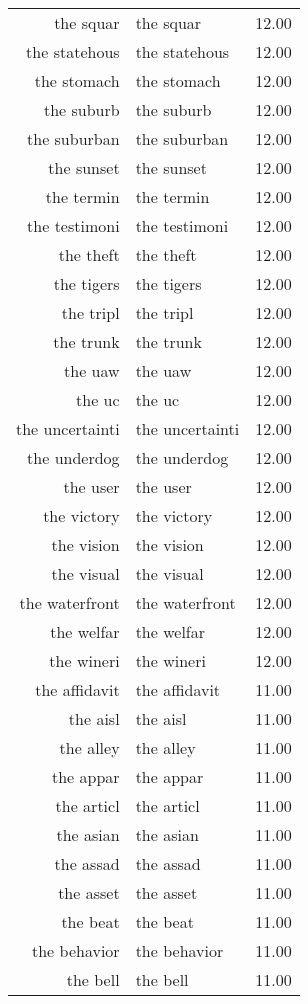 \begin{table}[ht]
\begin{tabular}{rlr}
  the squar & the squar & 12.00 \\ 
  the statehous & the statehous & 12.00 \\ 
  the stomach & the stomach & 12.00 \\ 
  the suburb & the suburb & 12.00 \\ 
  the suburban & the suburban & 12.00 \\ 
  the sunset & the sunset & 12.00 \\ 
  the termin & the termin & 12.00 \\ 
  the testimoni & the testimoni & 12.00 \\ 
  the theft & the theft & 12.00 \\ 
  the tigers & the tigers & 12.00 \\ 
  the tripl & the tripl & 12.00 \\ 
  the trunk & the trunk & 12.00 \\ 
  the uaw & the uaw & 12.00 \\ 
  the uc & the uc & 12.00 \\ 
  the uncertainti & the uncertainti & 12.00 \\ 
  the underdog & the underdog & 12.00 \\ 
  the user & the user & 12.00 \\ 
  the victory & the victory & 12.00 \\ 
  the vision & the vision & 12.00 \\ 
  the visual & the visual & 12.00 \\ 
  the waterfront & the waterfront & 12.00 \\ 
  the welfar & the welfar & 12.00 \\ 
  the wineri & the wineri & 12.00 \\ 
  the affidavit & the affidavit & 11.00 \\ 
  the aisl & the aisl & 11.00 \\ 
  the alley & the alley & 11.00 \\ 
  the appar & the appar & 11.00 \\ 
  the articl & the articl & 11.00 \\ 
  the asian & the asian & 11.00 \\ 
  the assad & the assad & 11.00 \\ 
  the asset & the asset & 11.00 \\ 
  the beat & the beat & 11.00 \\ 
  the behavior & the behavior & 11.00 \\ 
  the bell & the bell & 11.00 \\ 

\end{tabular}
\end{table}
